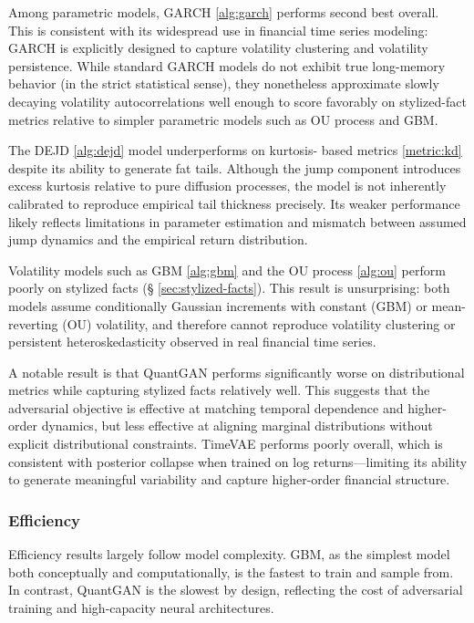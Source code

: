 \documentclass[sigconf]{acmart}
\begin{document}
    Among parametric models, GARCH \ref{alg:garch} performs second 
    best overall. This is
    consistent with its widespread use in financial time series modeling:
    GARCH is explicitly designed to capture volatility clustering and
    volatility persistence. While standard GARCH models do not exhibit
    true long-memory behavior (in the strict statistical sense), they
    nonetheless approximate slowly decaying volatility autocorrelations
    well enough to score favorably on stylized-fact metrics relative to
    simpler parametric models such as OU process and GBM.

    The DEJD \ref{alg:dejd} model underperforms on kurtosis-
    based metrics \ref{metric:kd} despite its ability to generate fat tails.
    Although the jump component introduces excess kurtosis relative to pure
    diffusion processes, the model is not inherently calibrated to
    reproduce empirical tail thickness precisely. Its weaker performance
    likely reflects limitations in parameter estimation and
    mismatch between assumed jump dynamics and the empirical return
    distribution.

    Volatility models such as GBM \ref{alg:gbm} and the OU process \ref{alg:ou}
     perform poorly on
    stylized facts (§ \ref{sec:stylized-facts}). This result is unsurprising: 
    both models assume
    conditionally Gaussian increments with constant (GBM) or mean-reverting
    (OU) volatility, and therefore cannot reproduce volatility clustering
    or persistent heteroskedasticity observed in real financial time
    series.

    A notable result is that QuantGAN performs significantly worse on
    distributional metrics while capturing stylized facts relatively well.
    This suggests that the adversarial objective is effective at matching
    temporal dependence and higher-order dynamics, but less effective at
    aligning marginal distributions without explicit distributional
    constraints. TimeVAE performs poorly overall, which is consistent with
    posterior collapse when trained on log returns—limiting its ability to
    generate meaningful variability and capture higher-order financial
    structure.

    \subsubsection{Efficiency}

    Efficiency results largely follow model complexity. GBM, as the
    simplest model both conceptually and computationally, is the fastest
    to train and sample from. In contrast, QuantGAN is the slowest by
    design, reflecting the cost of adversarial training and high-capacity
    neural architectures.
\end{document}

